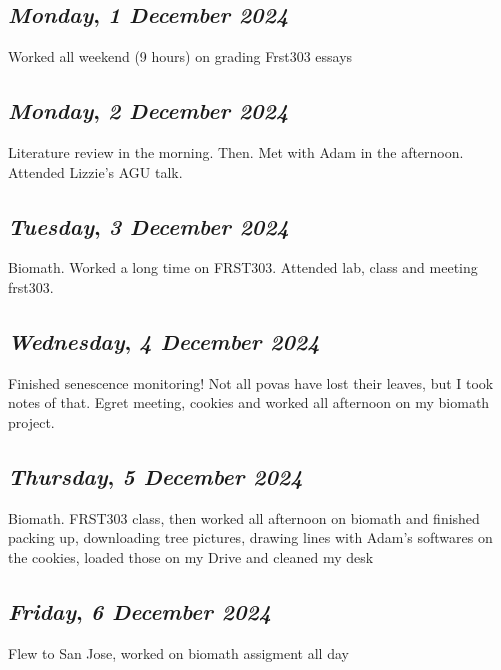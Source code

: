 \begin{center}
\section*{\month}
\end{center}

\def\day{\textit{1 December 2024}}
\def\weekday{\textit{Monday}}
\subsection*{\weekday, \day}
Worked all weekend (9 hours) on grading Frst303 essays
\def\day{\textit{2 December 2024}}
\def\weekday{\textit{Monday}}
\subsection*{\weekday, \day}
Literature review in the morning. Then. Met with Adam in the afternoon. Attended Lizzie's AGU talk. 

\def\day{\textit{3 December 2024}}
\def\weekday{\textit{Tuesday}}
\subsection*{\weekday, \day}
Biomath. Worked a long time on FRST303. Attended lab, class and meeting frst303.

\def\day{\textit{4 December 2024}}
\def\weekday{\textit{Wednesday}}
\subsection*{\weekday, \day}
Finished senescence monitoring! Not all povas have lost their leaves, but I took notes of that. Egret meeting, cookies and worked all afternoon on my biomath project.

\def\day{\textit{5 December 2024}}
\def\weekday{\textit{Thursday}}
\subsection*{\weekday, \day}
Biomath. FRST303 class, then worked all afternoon on biomath and finished packing up, downloading tree pictures, drawing lines with Adam's softwares on the cookies, loaded those on my Drive and cleaned my desk

\def\day{\textit{6 December 2024}}
\def\weekday{\textit{Friday}}
\subsection*{\weekday, \day}
Flew to San Jose, worked on biomath assigment all day

